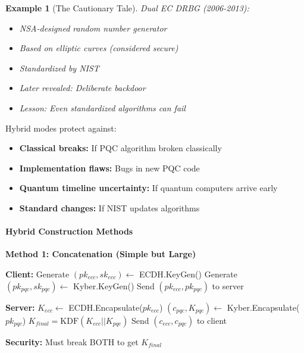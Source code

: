 \documentclass[11pt,a4paper]{article}
\newtheorem{example}{Example}
\begin{document}
\begin{example}[The Cautionary Tale]
Dual EC DRBG (2006-2013):
\begin{itemize}
    \item NSA-designed random number generator
    \item Based on elliptic curves (considered secure)
    \item Standardized by NIST
    \item Later revealed: Deliberate backdoor
    \item Lesson: Even standardized algorithms can fail
\end{itemize}
\end{example}

Hybrid modes protect against:
\begin{itemize}
    \item \textbf{Classical breaks:} If PQC algorithm broken classically
    \item \textbf{Implementation flaws:} Bugs in new PQC code
    \item \textbf{Quantum timeline uncertainty:} If quantum computers arrive early
    \item \textbf{Standard changes:} If NIST updates algorithms
\end{itemize}

\paragraph{Hybrid Construction Methods}

\textbf{Method 1: Concatenation (Simple but Large)}

\begin{algorithm}
\caption{Hybrid Key Exchange - Concatenation}
\label{alg:hybrid-concat}
\begin{algorithmic}[1]
\State \textbf{Client:}
\State \quad Generate $(pk_{ecc}, sk_{ecc}) \leftarrow$ ECDH.KeyGen()
\State \quad Generate $(pk_{pqc}, sk_{pqc}) \leftarrow$ Kyber.KeyGen()
\State \quad Send $(pk_{ecc}, pk_{pqc})$ to server

\State \textbf{Server:}
\State \quad $K_{ecc} \leftarrow$ ECDH.Encapsulate($pk_{ecc}$)
\State \quad $(c_{pqc}, K_{pqc}) \leftarrow$ Kyber.Encapsulate($pk_{pqc}$)
\State \quad $K_{final} = \text{KDF}(K_{ecc} || K_{pqc})$
\State \quad Send $(c_{ecc}, c_{pqc})$ to client

\State \textbf{Security:} Must break BOTH to get $K_{final}$
\end{algorithmic}
\end{algorithm}
\end{document}
